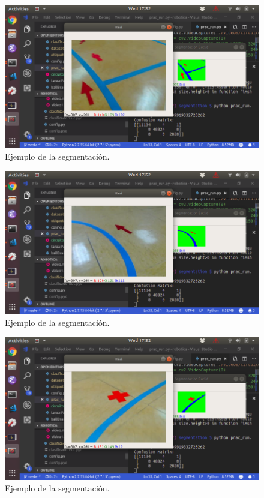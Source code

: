 \documentclass{article}
\begin{document}
	\begin{figure}[H]
	    \centering
	    \includegraphics[width=12cm]{figura1.png}
	    \caption{Ejemplo de la segmentación.}
	    \label{fig:figura1}
	\end{figure}

	\begin{figure}[H]
	    \centering
	    \includegraphics[width=12cm]{figura2.png}
	    \caption{Ejemplo de la segmentación.}
	    \label{fig:figura2}
	\end{figure}

	\begin{figure}[H]
	    \centering
	    \includegraphics[width=12cm]{figura3.png}
	    \caption{Ejemplo de la segmentación.}
	    \label{fig:figura3}
	\end{figure}
\end{document}

